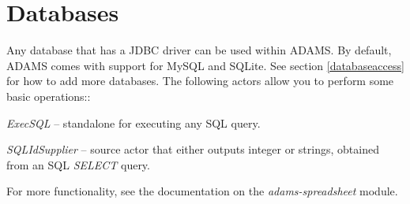 \newpage
\section{Databases}
Any database that has a JDBC driver can be used within ADAMS. By default,
ADAMS comes with support for MySQL and SQLite. See section \ref{databaseaccess} 
for how to add more databases. The following actors allow you to perform
some basic operations::
\begin{tight_itemize}
	\item \textit{ExecSQL} -- standalone for executing any SQL query.
	\item \textit{SQLIdSupplier} -- source actor that either outputs integer
	or strings, obtained from an SQL \textit{SELECT} query.
\end{tight_itemize}
For more functionality, see the documentation on the \textit{adams-spreadsheet} 
module.


\newpage
